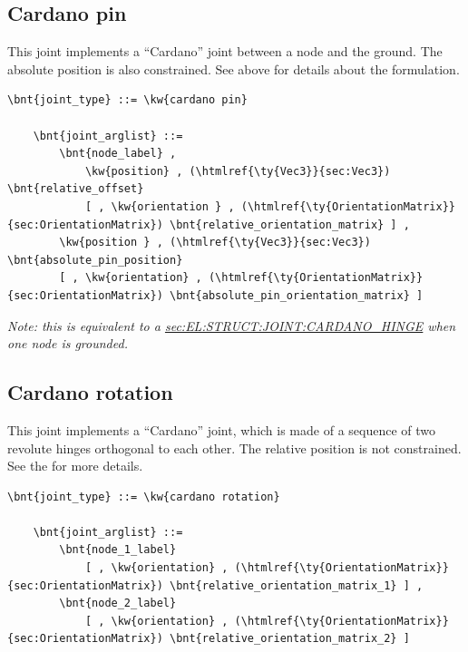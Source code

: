 \subsection{Cardano pin}
\label{sec:EL:STRUCT:JOINT:CARDANO_PIN}
This joint implements a ``Cardano'' joint between a node and the ground.
The absolute position is also constrained.
See above for details about the formulation.
\begin{Verbatim}[commandchars=\\\{\}]
    \bnt{joint_type} ::= \kw{cardano pin}

    \bnt{joint_arglist} ::= 
        \bnt{node_label} ,
            \kw{position} , (\htmlref{\ty{Vec3}}{sec:Vec3}) \bnt{relative_offset}
            [ , \kw{orientation } , (\htmlref{\ty{OrientationMatrix}}{sec:OrientationMatrix}) \bnt{relative_orientation_matrix} ] ,
        \kw{position } , (\htmlref{\ty{Vec3}}{sec:Vec3}) \bnt{absolute_pin_position}
        [ , \kw{orientation} , (\htmlref{\ty{OrientationMatrix}}{sec:OrientationMatrix}) \bnt{absolute_pin_orientation_matrix} ]
\end{Verbatim}
\emph{Note: this is equivalent to a
\hyperref{\kw{cardano hinge}}{\kw{cardano hinge} (see Section~}{)}{sec:EL:STRUCT:JOINT:CARDANO_HINGE}
when one node is grounded.
}

\subsection{Cardano rotation}
\label{sec:EL:STRUCT:JOINT:CARDANO_ROTATION}
This joint implements a ``Cardano'' joint, which is made of a sequence
of two revolute hinges orthogonal to each other.
The relative position is not constrained.
See the  for more details.
\begin{Verbatim}[commandchars=\\\{\}]
    \bnt{joint_type} ::= \kw{cardano rotation}

    \bnt{joint_arglist} ::= 
        \bnt{node_1_label}
            [ , \kw{orientation} , (\htmlref{\ty{OrientationMatrix}}{sec:OrientationMatrix}) \bnt{relative_orientation_matrix_1} ] ,
        \bnt{node_2_label}
            [ , \kw{orientation} , (\htmlref{\ty{OrientationMatrix}}{sec:OrientationMatrix}) \bnt{relative_orientation_matrix_2} ]
\end{Verbatim}

